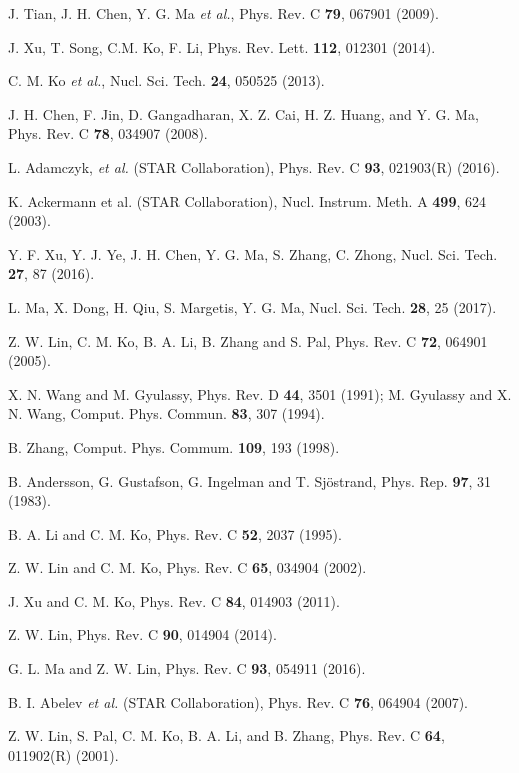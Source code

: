 \documentclass[twocolumn,aps,prc,showpacs,superscriptaddress,preprintnumbers,floatfix,nofootinbib]{revtex4}
\begin{document}
\begin{CJK*}{GBK}{song}
\begin{thebibliography}{88}
 J. Tian, J. H. Chen, Y. G. Ma {\it et al.}, Phys. Rev. C {\bf 79}, 067901 (2009).

 J. Xu, T. Song, C.M. Ko, F. Li,  Phys. Rev. Lett. {\bf 112}, 012301 (2014).

 C. M. Ko {\it et al.}, Nucl. Sci. Tech.  {\bf 24}, 050525 (2013).

 J. H. Chen, F. Jin, D. Gangadharan, X. Z. Cai, H. Z. Huang, and Y. G. Ma,  Phys. Rev. C {\bf 78}, 034907 (2008).

 L. Adamczyk, {\it et al.} (STAR Collaboration), Phys. Rev. C {\bf 93}, 021903(R) (2016).

K. Ackermann et al. (STAR Collaboration), Nucl. Instrum. Meth. A {\bf 499}, 624 (2003).

Y. F. Xu, Y. J. Ye, J. H. Chen, Y. G. Ma, S. Zhang, C. Zhong,  Nucl. Sci. Tech. {\bf 27}, 87 (2016).

L.  Ma, X. Dong, H. Qiu, S. Margetis, Y. G. Ma, Nucl. Sci. Tech. {\bf 28},  25 (2017).


 Z. W. Lin, C. M. Ko, B. A. Li, B. Zhang and S. Pal, Phys. Rev. C {\bf 72}, 064901 (2005).

 X. N. Wang and M. Gyulassy, Phys. Rev. D {\bf 44}, 3501 (1991); M. Gyulassy and X. N. Wang, Comput. Phys. Commun. {\bf 83}, 307 (1994).

 B. Zhang, Comput. Phys. Commum. {\bf 109}, 193 (1998).

 B. Andersson, G. Gustafson, G. Ingelman and T. Sj\"ostrand, Phys. Rep. {\bf 97}, 31 (1983).

 B. A. Li and C. M. Ko, Phys. Rev. C {\bf 52}, 2037 (1995).

 Z. W. Lin and C. M. Ko, Phys. Rev. C {\bf 65}, 034904 (2002).

 J. Xu and C. M. Ko, Phys. Rev. C {\bf 84}, 014903 (2011).

 Z. W. Lin, Phys. Rev. C {\bf 90}, 014904 (2014).

 G. L. Ma and Z. W. Lin, Phys. Rev. C {\bf 93}, 054911 (2016).

 B. I. Abelev {\it et al.} (STAR Collaboration), Phys. Rev. C {\bf 76}, 064904 (2007). %


 Z. W. Lin, S. Pal, C. M. Ko, B.  A. Li, and B. Zhang, Phys. Rev. C {\bf 64}, 011902(R) (2001).


\end{thebibliography}
\end{CJK*}
\end{document}
